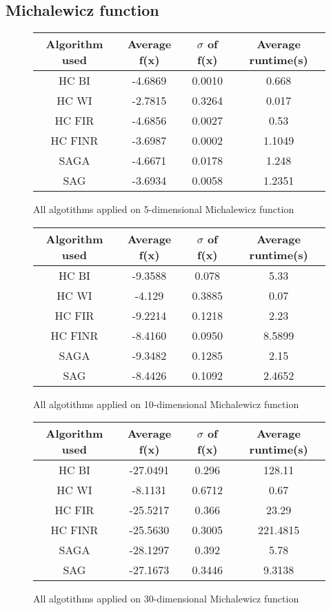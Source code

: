 \documentclass{article}
\begin{document}
\subsection{Michalewicz function}

\begin{figure}[H]
	\begin{tabular}{|c||c|c|c|} \hline
		Algorithm used & Average f(x) & $\sigma$ of f(x) & Average runtime(s) \\ \hline \hline
		HC BI & -4.6869 & 0.0010 & 0.668 \\ \hline
		HC WI & -2.7815 & 0.3264 & 0.017 \\ \hline
		HC FIR & -4.6856 & 0.0027 & 0.53 \\ \hline
		HC FINR & -3.6987 & 0.0002 & 1.1049 \\ \hline
		SAGA & -4.6671 & 0.0178 & 1.248 \\ \hline
		SAG & -3.6934 & 0.0058 & 1.2351 \\ \hline
\end{tabular}
\caption{All algotithms applied on 5-dimensional Michalewicz function}
\end{figure}

\begin{figure}[H]
	\begin{tabular}{|c||c|c|c|} \hline
		Algorithm used & Average f(x) & $\sigma$ of f(x) & Average runtime(s) \\ \hline \hline
		HC BI & -9.3588 & 0.078 & 5.33 \\ \hline
		HC WI & -4.129 & 0.3885 & 0.07 \\ \hline
		HC FIR & -9.2214 & 0.1218 & 2.23 \\ \hline
		HC FINR & -8.4160 & 0.0950 & 8.5899 \\ \hline
		SAGA & -9.3482 & 0.1285 & 2.15 \\ \hline
		SAG & -8.4426 & 0.1092 & 2.4652 \\ \hline
\end{tabular}
\caption{All algotithms applied on 10-dimensional Michalewicz function}
\end{figure}

\begin{figure}[H]
	\begin{tabular}{|c||c|c|c|} \hline
		Algorithm used & Average f(x) & $\sigma$ of f(x) & Average runtime(s) \\ \hline \hline
		HC BI & -27.0491 & 0.296 & 128.11 \\ \hline
		HC WI & -8.1131 & 0.6712 & 0.67 \\ \hline
		HC FIR & -25.5217 & 0.366 & 23.29 \\ \hline
		HC FINR & -25.5630 & 0.3005 & 221.4815 \\ \hline
		SAGA & -28.1297 & 0.392 & 5.78 \\ \hline
		SAG & -27.1673 & 0.3446 & 9.3138 \\ \hline
\end{tabular}
\caption{All algotithms applied on 30-dimensional Michalewicz function}
\end{figure}
\end{document}
